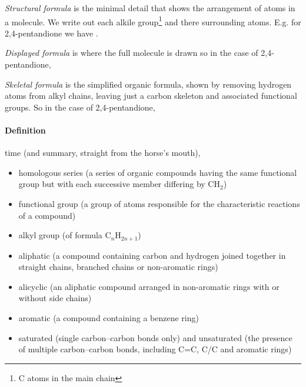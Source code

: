 	\textit{Structural formula} is the minimal detail that shows the arrangement of atoms in a molecule. We write out each alkile group\footnote{C atoms in the main chain} and there surrounding atoms. E.g. for 2,4-pentandione we have .
	
	\textit{Displayed formula} is where the full molecule is drawn so in the case of 2,4-pentandione,
	
	\begin{center}
	\end{center}
	
	\textit{Skeletal formula} is the simplified organic formula, shown by removing hydrogen atoms from alkyl chains, leaving just a carbon skeleton and associated functional groups. So in the case of 2,4-pentandione,
	
	\begin{center}
	\end{center}
	
	\paragraph{Definition} time (and summary, straight from the horse's mouth),
	\begin{itemize}
		\item homologous series (a series of organic compounds having the same functional group but with each successive member differing by CH$_2$)
		\item functional group (a group of atoms responsible for the characteristic reactions of a compound)
		\item alkyl group (of formula C$_n$H$_{2n+1}$)
		\item aliphatic (a compound containing carbon and hydrogen joined together in straight chains, branched chains or non-aromatic rings)
		\item alicyclic (an aliphatic compound arranged in non-aromatic rings with or without side chains)
		\item aromatic (a compound containing a benzene ring)
		\item saturated (single carbon–carbon bonds only) and unsaturated (the presence of multiple carbon–carbon bonds, including C=C, C/C and  aromatic rings)
	\end{itemize}
	
